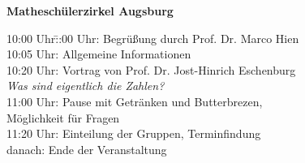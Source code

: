 \documentclass[a4paper,ngerman,14pt,landscape]{article}
\begin{document}
\doublespacing

\Huge

\begin{center}
  \textbf{Matheschülerzirkel Augsburg}
\end{center}
\vspace{0.2em}

\Huge

\begin{tabbing}
  10:00 Uhr:\quad \= :00 Uhr: \> Begrüßung durch Prof. Dr. Marco Hien \\
  10:05 Uhr: \> Allgemeine Informationen \\[0.5em]
  10:20 Uhr: \> Vortrag von Prof. Dr. Jost-Hinrich Eschenburg \\
  \> \emph{Was sind eigentlich die Zahlen?} \\[0.5em]
  11:00 Uhr: \> Pause mit Getränken und Butterbrezen, \\
  \> Möglichkeit für Fragen \\[0.5em]
  11:20 Uhr: \> Einteilung der Gruppen, Terminfindung \\
  danach: \> Ende der Veranstaltung
\end{tabbing}
\end{document}
